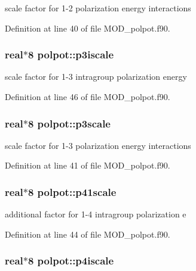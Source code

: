 scale factor for 1-\/2 polarization energy interactions 



Definition at line 40 of file M\-O\-D\-\_\-polpot.\-f90.

\hypertarget{classpolpot_ae7adb835efeba4114c37590e29930704}{
\subsubsection[{p3iscale}]{\setlength{\rightskip}{0pt plus 5cm}real$\ast$8 polpot\-::p3iscale}}\label{classpolpot_ae7adb835efeba4114c37590e29930704}


scale factor for 1-\/3 intragroup polarization energy 



Definition at line 46 of file M\-O\-D\-\_\-polpot.\-f90.

\hypertarget{classpolpot_a9acb74d6d1ab628d38abe5e78eb3e085}{
\subsubsection[{p3scale}]{\setlength{\rightskip}{0pt plus 5cm}real$\ast$8 polpot\-::p3scale}}\label{classpolpot_a9acb74d6d1ab628d38abe5e78eb3e085}


scale factor for 1-\/3 polarization energy interactions 



Definition at line 41 of file M\-O\-D\-\_\-polpot.\-f90.

\hypertarget{classpolpot_a597b6d994d068ea202fba93510f45ed3}{
\subsubsection[{p41scale}]{\setlength{\rightskip}{0pt plus 5cm}real$\ast$8 polpot\-::p41scale}}\label{classpolpot_a597b6d994d068ea202fba93510f45ed3}


additional factor for 1-\/4 intragroup polarization e 



Definition at line 44 of file M\-O\-D\-\_\-polpot.\-f90.

\hypertarget{classpolpot_a2a48e35fedd82d2565eb7ec90e2f6997}{
\subsubsection[{p4iscale}]{\setlength{\rightskip}{0pt plus 5cm}real$\ast$8 polpot\-::p4iscale}}\label{classpolpot_a2a48e35fedd82d2565eb7ec90e2f6997}


